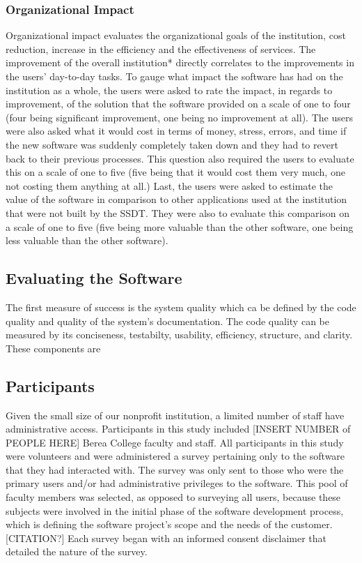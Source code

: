 \subsubsection{Organizational Impact}
Organizational impact evaluates the organizational goals of the institution, cost reduction, increase in the efficiency and the effectiveness of services. The improvement of the overall institution* directly correlates to the improvements in the users' day-to-day tasks. To gauge what impact the software has had on the institution as a whole, the users were asked to rate the impact, in regards to improvement, of the solution that the software provided on a scale of one to four (four being significant improvement, one being no improvement at all). The users were also asked what it would cost in terms of money, stress, errors, and time if the new software was suddenly completely taken down and they had to revert back to their previous processes. This question also required the users to evaluate this on a scale of one to five (five being that it would cost them very much, one not costing them anything at all.) Last, the users were asked to estimate the value of the software in comparison to other applications used at the institution that were not built by the SSDT. They were also to evaluate this comparison on a scale of one to five (five being more valuable than the other software, one being less valuable than the other software).


\subsection{Evaluating the Software}
 The first measure of success is the system quality which ca be defined by the code quality and quality of the system's documentation. The code quality can be measured by its conciseness, testabilty, usability, efficiency, structure, and clarity. These components are


\subsection{Participants}
Given the small size of our nonprofit institution, a limited number of staff have administrative access. Participants in this study included [INSERT NUMBER of PEOPLE HERE] Berea College faculty and staff. All participants in this study were volunteers and were administered a survey pertaining only to the software that they had interacted with. The survey was only sent to those who were the primary users and/or had administrative privileges to the software. This pool of faculty members was selected, as opposed to surveying all users, because these subjects were involved in the initial phase of the software development process, which is defining the software project’s scope and the needs of the customer. [CITATION?] Each survey began with an informed consent disclaimer that detailed the nature of the survey.

